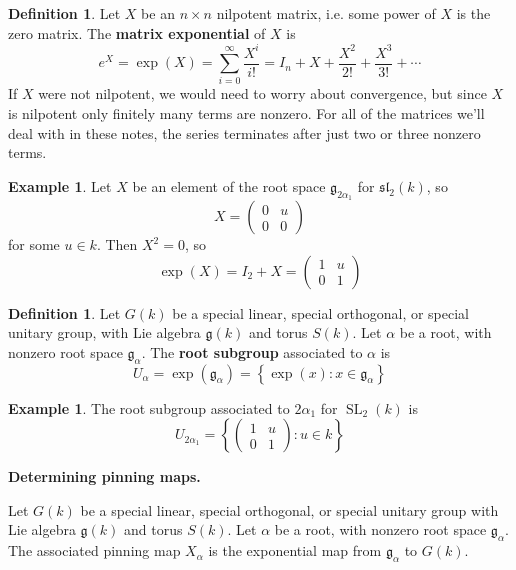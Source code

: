 \documentclass[12pt]{article}
\theoremstyle{definition}
\newtheorem{definition}[theorem]{Definition}
\newtheorem{example}[theorem]{Example}
\newcommand{\lb}{\left\{}
\newcommand{\rb}{\right\}}
\newcommand{\tbf}{\textbf}
\newcommand{\noi}{\noindent}
\newcommand{\frakg}{\mathfrak{g}}
\newcommand{\fraksl}{\mathfrak{sl}}
\DeclareMathOperator{\SL}{SL}
\begin{document}
\begin{definition}
Let $X$ be an $n \times n$ nilpotent matrix, i.e. some power of $X$ is the zero matrix. The \tbf{matrix exponential} of $X$ is
\[
	e^X = \exp(X) = \sum_{i=0}^\infty \frac{X^i}{i!} = I_n + X + \frac{X^2}{2!} + \frac{X^3}{3!} + \cdots
\]
If $X$ were not nilpotent, we would need to worry about convergence, but since $X$ is nilpotent only finitely many terms are nonzero. For all of the matrices we'll deal with in these notes, the series terminates after just two or three nonzero terms.
\end{definition}

\begin{example}
Let $X$ be an element of the root space $\frakg_{2\alpha_1}$ for $\fraksl_2(k)$, so
\[
	X = 	\begin{pmatrix}
		0 & u \\
		0 & 0 
	\end{pmatrix}
\]
for some $u \in k$. Then $X^2 = 0$, so
\[
	\exp(X) = I_2 + X =
	\begin{pmatrix}
		1 & u \\
		0 & 1 
	\end{pmatrix}
\]
\end{example}

\begin{definition}
Let $G(k)$ be a special linear, special orthogonal, or special unitary group, with Lie algebra $\frakg(k)$ and torus $S(k)$. Let $\alpha$ be a root, with nonzero root space $\frakg_\alpha$. The \tbf{root subgroup} associated to $\alpha$ is
\[
	U_\alpha = \exp (\frakg_\alpha) = \lb \exp(x) : x \in \frakg_\alpha \rb
\]
\end{definition}

\begin{example}
The root subgroup associated to $2\alpha_1$ for $\SL_2(k)$ is
\[
	U_{2\alpha_1} =
	\lb
	\begin{pmatrix}
		1 & u \\
		0 & 1 
	\end{pmatrix}
	: u \in k
	\rb
\]
\end{example}

\begin{framed}
\noi \tbf{Determining pinning maps.} 

\noi Let $G(k)$ be a special linear, special orthogonal, or special unitary group with Lie algebra $\frakg(k)$ and torus $S(k)$. Let $\alpha$ be a root, with nonzero root space $\frakg_\alpha$. The associated pinning map $X_\alpha$ is the exponential map from $\frakg_\alpha$ to $G(k)$.
\end{framed}
\end{document}
